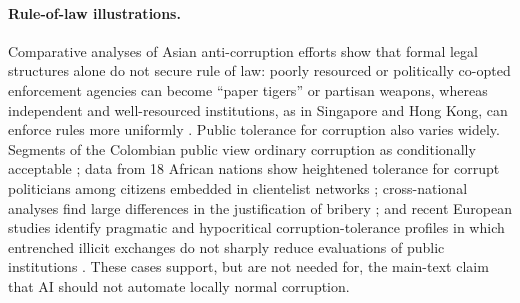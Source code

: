 \documentclass{article}
\theoremstyle{plain}
\theoremstyle{definition}
\theoremstyle{remark}
\begin{document}
\paragraph{Rule-of-law illustrations.}
Comparative analyses of Asian anti-corruption efforts show that formal legal structures alone do not secure rule of law: poorly resourced or politically co-opted enforcement agencies can become ``paper tigers'' or partisan weapons, whereas independent and well-resourced institutions, as in Singapore and Hong Kong, can enforce rules more uniformly \citep{quah2011curbing}. Public tolerance for corruption also varies widely. Segments of the Colombian public view ordinary corruption as conditionally acceptable \citep{lopez2017mapping}; data from 18 African nations show heightened tolerance for corrupt politicians among citizens embedded in clientelist networks \citep{chang2017insider}; cross-national analyses find large differences in the justification of bribery \citep{kravtsova2017values}; and recent European studies identify pragmatic and hypocritical corruption-tolerance profiles in which entrenched illicit exchanges do not sharply reduce evaluations of public institutions \citep{megias2023deontological, letki2023accept}. These cases support, but are not needed for, the main-text claim that AI should not automate locally normal corruption.
\end{document}
